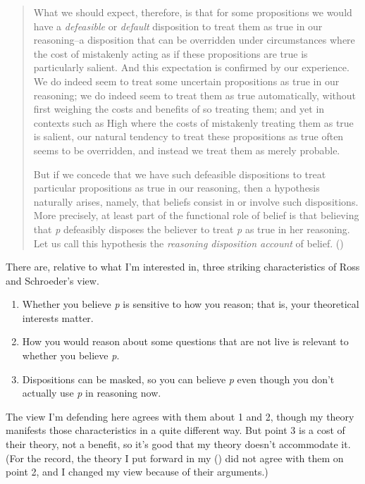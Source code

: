 \documentclass[
  10pt,
  letterpaper,
  twoside]{scrbook}
\providecommand{\tightlist}{%
  \setlength{\itemsep}{0pt}\setlength{\parskip}{0pt}}\usepackage{longtable,booktabs,array}
\begin{document}
\begin{quote}
What we should expect, therefore, is that for some propositions we would
have a \emph{defeasible} or \emph{default} disposition to treat them as
true in our reasoning--a disposition that can be overridden under
circumstances where the cost of mistakenly acting as if these
propositions are true is particularly salient. And this expectation is
confirmed by our experience. We do indeed seem to treat some uncertain
propositions as true in our reasoning; we do indeed seem to treat them
as true automatically, without first weighing the costs and benefits of
so treating them; and yet in contexts such as High where the costs of
mistakenly treating them as true is salient, our natural tendency to
treat these propositions as true often seems to be overridden, and
instead we treat them as merely probable.

But if we concede that we have such defeasible dispositions to treat
particular propositions as true in our reasoning, then a hypothesis
naturally arises, namely, that beliefs consist in or involve such
dispositions. More precisely, at least part of the functional role of
belief is that believing that \emph{p} defeasibly disposes the believer
to treat \emph{p} as true in her reasoning. Let us call this hypothesis
the \emph{reasoning disposition account} of belief.
()
\end{quote}

There are, relative to what I'm interested in, three striking
characteristics of Ross and Schroeder's view.

\begin{enumerate}
\def\labelenumi{\arabic{enumi}.}
\tightlist
\item
  Whether you believe \emph{p} is sensitive to how you reason; that is,
  your theoretical interests matter.
\item
  How you would reason about some questions that are not live is
  relevant to whether you believe \emph{p}.
\item
  Dispositions can be masked, so you can believe \emph{p} even though
  you don't actually use \emph{p} in reasoning now.
\end{enumerate}

The view I'm defending here agrees with them about 1 and 2, though my
theory manifests those characteristics in a quite different way. But
point 3 is a cost of their theory, not a benefit, so it's good that my
theory doesn't accommodate it. (For the record, the theory I put forward
in my () did not agree with
them on point 2, and I changed my view because of their arguments.)
\end{document}
